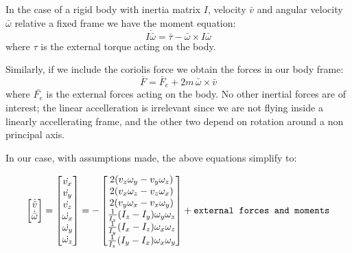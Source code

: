 
In the case of a rigid body with inertia matrix $I$, velocity $\bar{v}$ and angular velocity $\bar{\omega}$ relative a fixed frame we have the moment equation:
\begin{equation}
    I \dot{\bar{\omega}} = \bar{\tau} - \bar{\omega} \times
    I \bar{\omega}
\end{equation}
where $\tau$ is the external torque acting on the body.

Similarly, if we include the coriolis force we obtain the forces in our body frame:
\begin{equation}
    \bar{F} = \bar{F}_{e} 
    + 2 m \, \bar{\omega} \times \bar{v}
\end{equation}
where $\bar{F_e}$ is the external forces acting on the body.
No other inertial forces are of interest;
the linear accelleration is irrelevant since we are not flying inside a linearly accellerating frame, and the other two depend on rotation around a non principal axis.

In our case, with assumptions made, the above equations simplify to:

\begin{equation}
\left[
\begin{matrix}
    \dot{\bar{v}} \\
    \dot{\bar{\omega}}
\end{matrix} \right]
=
\left[
\begin{matrix}
    \dot{v_x} \\
    \dot{v_y} \\
    \dot{v_z} \\
    \dot{\omega_x} \\ 
    \dot{\omega_y} \\
    \dot{\omega_z}
\end{matrix} \right] 
=
- \left[ \begin{matrix}
2 ( v_z \omega_y - v_y \omega_z )\\
2 ( v_x \omega_z - v_z \omega_x )\\
2 ( v_y \omega_x - v_x \omega_y )\\
\frac{1}{I_x} (I_z - I_y) \omega_y \omega_z \\
\frac{1}{I_y} (I_x - I_z) \omega_x \omega_z \\
\frac{1}{I_z} (I_y - I_x) \omega_x \omega_y 
\end{matrix} \right]
+ \verb!external forces and moments!
\end{equation}